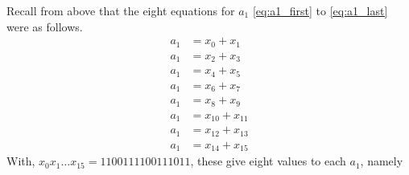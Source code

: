 \begin{enumerate}[label=(\roman*)]
\begin{comment}
	&= \octavec{disp(x_5)} + \octavec{disp(x_9)} + \octavec{disp(x_13)} + \octavec{disp(x_14)} + \octavec{disp(x_15)} = \octavec{disp(mod(x_5 + x_9+x_13+x_14+x_15,2))}\\
	a_0 &= x_6 + x_{10} + x_{13} + x_{14} + x_{15}\\
	&= \octavec{disp(x_6)} + 
	  \octavec{disp(x_10)} + 
	  \octavec{disp(x_13)} + 
	  \octavec{disp(x_14)} + 
	  \octavec{disp(x_15)} = 
	  \octavec{disp(mod(x_6 + x_10 + x_13 + x_14 + x_15,2))}\\
	a_0 &= x_5 + x_8 + x_{10} + x_{11} + x_{13} + x_{14} + x_{15},\\
	a_0 &= x_6 + x_{11} + x_{12} + x_{14} + x_{15}\\
	&= \octavec{disp(x_6)} + 
	  \octavec{disp(x_11)} + 
	  \octavec{disp(x_12)} + 
	  \octavec{disp(x_14)} + 
	  \octavec{disp(x_15)}
	   = \octavec{disp(mod(x_6 + x_11 + x_12 + x_14 + x_15,2))}\\
	a_0 &= x_3 + x_8 + x_{11} + x_{12} + x_{13} + x_{14} + x_{15}\\
	&= \octavec{disp(x_3)} + 
	  \octavec{disp(x_8)} + 
	  \octavec{disp(x_11)} + 
	  \octavec{disp(x_12)} + 
	  \octavec{disp(x_13)} +
	  \octavec{disp(x_14)} +
	  \octavec{disp(x_15)} 
	  = 
	  \octavec{disp(mod(x_3 + x_8 + x_11 + x_12 + x_13 + x_14 + x_15,2))}\\
	a_0 &= x_2 + x_8 + x_{10} + x_{12} + x_{13} + x_{14} + x_{15}\\
	&= \octavec{disp(x_2)} + 
	  \octavec{disp(x_8)} + 
	  \octavec{disp(x_10)} + 
	  \octavec{disp(x_12)} + 
	  \octavec{disp(x_13)} +
	  \octavec{disp(x_14)} +
	  \octavec{disp(x_15)} 
	  = 
	  \octavec{disp(mod(x_2 + x_8 + x_10 + x_12 + x_13 + x_14 + x_15,2))}\\
	a_0 &= x_0 + x_8 + x_9 + x_{10} + x_{11} + x_{12} + x_{13} + x_{14} + x_{15}\\
	&= \octavec{disp(x_0)} + 
	  \octavec{disp(x_8)} + 
	  \octavec{disp(x_9)} + 
	  \octavec{disp(x_10)} + 
	  \octavec{disp(x_11)} + 
	  \octavec{disp(x_12)} + 
	  \octavec{disp(x_13)} +
	  \octavec{disp(x_14)} +
	  \octavec{disp(x_15)} 
	  = 
	  \octavec{disp(mod(x_0 + x_8 + +x_9 +x_10 + x_11+ x_12 + x_13 + x_14 + x_15,2))}
\end{align*}
\end{comment}%

Recall from above that the eight equations for $a_1$ \eqref{eq:a1_first} to \eqref{eq:a1_last} were as follows. 
\begin{align*}
	a_1 &= x_0 + x_1\\
	a_1 &= x_2 + x_3\\
	a_1 &= x_4 + x_5\\
	a_1 &= x_6 + x_7\\
	a_1 &= x_8 + x_9\\
	a_1 &= x_{10} + x_{11}\\
	a_1 &= x_{12} + x_{13}\\
	a_1 &= x_{14} + x_{15}
\end{align*}
With, $x_0x_1\ldots x_{15}=1100111100111011$, these give eight values to each $a_1$, namely


\end{enumerate}
